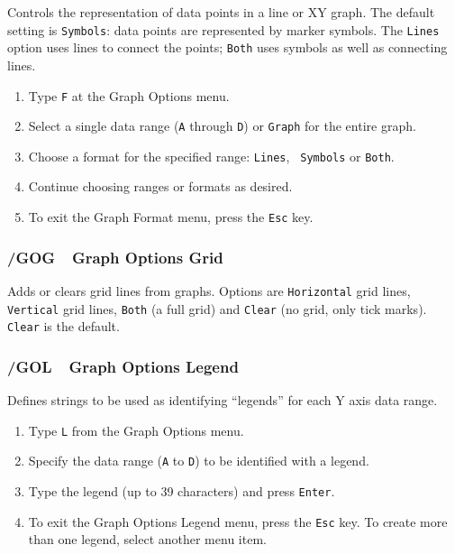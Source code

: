 \documentclass[titlepage]{article}
\begin{document}
Controls the representation of data points in a line or XY graph. 
The default setting is \texttt{Symbols}: data points are represented by
marker symbols.  The \texttt{Lines} option uses lines to connect the
points; \texttt{Both} uses symbols as well as connecting lines.
        
\usage{}
\begin{enumerate}\itemsep -2pt
\item Type \texttt{F} at the Graph Options menu.
\item Select a single data range (\texttt{A} through \texttt{D}) or
  \texttt{Graph} for the entire graph.
\item Choose a format for the specified range: {\tt Lines}, {\tt
    Symbols} or {\tt Both}.
\item Continue choosing ranges or formats as desired.
\item To exit the Graph Format menu, press the \texttt{Esc} key.
\end{enumerate}

\subsubsection{/GOG\ \     Graph Options Grid}

Adds or clears grid lines from graphs.  Options are 
\texttt{Horizontal} grid lines, \texttt{Vertical} grid lines,
\texttt{Both} (a full grid) and \texttt{Clear} (no grid, only tick
marks).  \texttt{Clear} is the default.


\subsubsection{/GOL\ \     Graph Options Legend}

Defines strings to be used as identifying ``legends'' for each Y axis
data range.

\usage{}
\begin{enumerate}\itemsep -2pt
\item Type \texttt{L} from the Graph Options menu.
\item Specify the data range (\texttt{A} to \texttt{D}) to be
    identified with a legend.
\item Type the legend (up to 39 characters) and press \texttt{Enter}.
\item To
    exit the Graph Options Legend menu, press the \texttt{Esc} key.
    To create more than one legend, select another menu
    item.
\end{enumerate}
\end{document}
